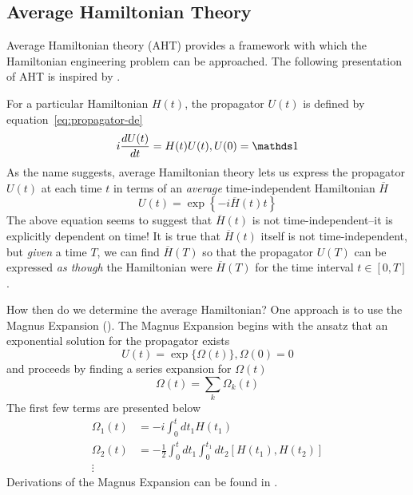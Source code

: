 \subsection{Average Hamiltonian Theory}\label{sec:AHT}

Average Hamiltonian theory (AHT) provides a framework with which the Hamiltonian engineering problem can be approached. The following presentation of AHT is inspired by \cite{brinkmann_2016, gerstein-dybowski, 1976ii}.

For a particular Hamiltonian $H(t)$, the propagator $U(t)$ is defined by equation~\ref{eq:propagator-de}
\begin{equation}
    i \ddt{U(t)} = H(t) U(t), U(0) = \identity
\end{equation}
As the name suggests, average Hamiltonian theory lets us express the propagator $U(t)$ at each time $t$ in terms of an \emph{average} time-independent Hamiltonian $\overline{H}$
\begin{equation}
    U(t) = \exp\left\{-i \overline{H}(t) t \right\}
\end{equation}
The above equation seems to suggest that $\overline{H}(t)$ is not time-independent--it is explicitly dependent on time! It is true that $\overline{H}(t)$ itself is not time-independent, but \emph{given} a time $T$, we can find $\overline{H}(T)$ so that the propagator $U(T)$ can be expressed \emph{as though} the Hamiltonian were $\overline{H}(T)$ for the time interval $t \in [0, T]$.

How then do we determine the average Hamiltonian? One approach is to use the Magnus Expansion (\cite{Blanes_2009,Magnus_Pedagogical}).
The Magnus Expansion begins with the ansatz that an exponential solution for the propagator exists
\begin{equation}
    U(t) = \exp\{\Omega(t)\}, \Omega(0) = 0
\end{equation}
and proceeds by finding a series expansion for $\Omega(t)$
\begin{equation}
    \Omega(t) = \sum_k \Omega_k(t)
\end{equation}
The first few terms are presented below
\begin{align}
    \Omega_1(t) &= -i \int_0^t dt_1 H(t_1) \\
    \Omega_2(t) &= -\frac{1}{2} \int_0^t dt_1 \int_0^{t_1} dt_2 [H(t_1), H(t_2)] \\
    \vdots \nonumber
\end{align}
Derivations of the Magnus Expansion can be found in
\cite{gerstein-dybowski,Blanes_2009,Magnus_Pedagogical}.

